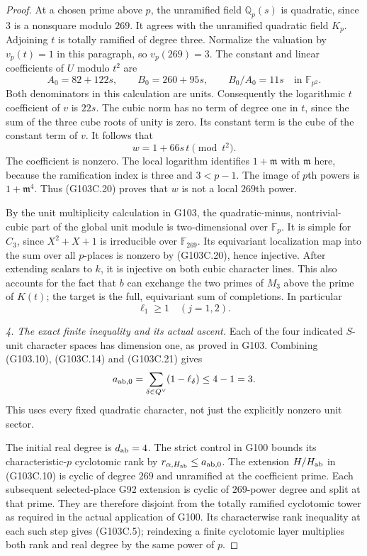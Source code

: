 \begin{proof}
At a chosen prime above $p$, the unramified field
$\mathbb Q_p(s)$ is quadratic, since $3$ is a nonsquare modulo $269$.
It agrees with the unramified quadratic field $K_p$.
Adjoining $t$ is totally ramified of degree three.  Normalize the
valuation by $v_p(t)=1$ in this paragraph, so $v_p(269)=3$.
The constant and linear coefficients of $U$ modulo $t^2$ are
\[
          A_0=82+122s,\qquad B_0=260+95s,
          \qquad B_0/A_0=11s\quad\text{in }\mathbb F_{p^2}.
                                                        \tag{G103C.19}
\]
Both denominators in this calculation are units.
Consequently the logarithmic $t$ coefficient of $v$ is $22s$.
The cubic norm has no term of degree one in $t$, since the sum
of the three cube roots of unity is zero.
Its constant term is the cube of the constant term of $v$.
It follows that
\[
                              w=1+66s\,t\pmod{t^2}.
                                                        \tag{G103C.20}
\]
The coefficient is nonzero.  The local logarithm identifies
$1+\mathfrak m$ with $\mathfrak m$ here, because the ramification
index is three and $3<p-1$.  The image of $p$th powers is
$1+\mathfrak m^4$.  Thus (G103C.20) proves that $w$ is not a
local $269$th power.

By the unit multiplicity calculation in G103, the
quadratic-minus, nontrivial-cubic part of the global unit module
is two-dimensional over $\mathbb F_p$.
It is simple for $C_3$, since $X^2+X+1$ is irreducible over
$\mathbb F_{269}$.  Its equivariant localization map into the
sum over all $p$-places is nonzero by (G103C.20), hence injective.
After extending scalars to $k$, it is injective on both cubic
character lines.  This also accounts for the fact that $b$ can
exchange the two primes of $M_3$ above the prime of $K(t)$;
the target is the full, equivariant sum of completions.
In particular
\[
                               \ell_1\ge1
                                      \quad(j=1,2).   \tag{G103C.21}
\]

\emph{4. The exact finite inequality and its actual ascent.}
Each of the four indicated $S$-unit character spaces has dimension
one, as proved in G103.  Combining (G103.10), (G103C.14) and
(G103C.21) gives
\[
 a_{{\rm ab},0}=\sum_{\delta\in Q^\vee}(1-\ell_\delta)
                          \le4-1=3.
\]
This uses every fixed quadratic character, not just the explicitly
nonzero unit sector.

The initial real degree is $d_{\rm ab}=4$.
The strict control in G100 bounds its characteristic-$p$
cyclotomic rank by $r_{\alpha,H_{\rm ab}}\le a_{{\rm ab},0}$.
The extension $H/H_{\rm ab}$ in (G103C.10) is cyclic of degree
$269$ and unramified at the coefficient prime.
Each subsequent selected-place G92 extension is cyclic of
$269$-power degree and split at that prime.
They are therefore disjoint from the totally ramified cyclotomic
tower as required in the actual application of G100.
Its characterwise rank inequality at each such step gives
(G103C.5); reindexing a finite cyclotomic layer multiplies both
rank and real degree by the same power of $p$.


\end{proof}
